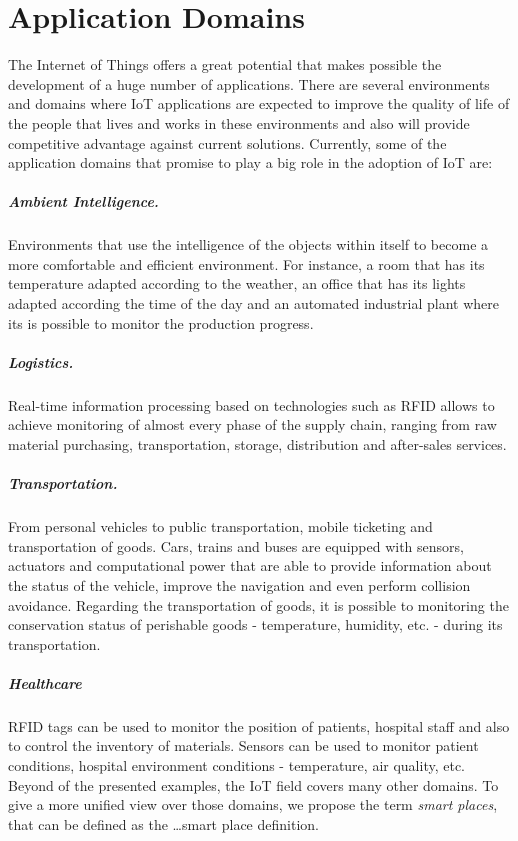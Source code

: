 \section{Application Domains}
\label{sec:application_domains}
The Internet of Things offers a great potential that makes possible the development of a huge number
of applications. There are several environments and domains where \gls{IoT} applications are expected
to improve the quality of life of the people that lives and works in these environments and also
will provide competitive advantage against current solutions. Currently, some of the application
domains that promise to play a big role in the adoption of \gls{IoT} are:

\subparagraph{Ambient Intelligence.} Environments that use the intelligence of the objects within
itself to become a more comfortable and efficient environment. For instance, a room that has its
temperature adapted according to the weather, an office that has its lights adapted according the time
of the day and an automated industrial plant where its is possible to monitor the production progress.
\subparagraph{Logistics.} Real-time information processing based on technologies such as \gls{RFID}
allows to achieve monitoring of almost every phase of the supply chain, ranging from raw material
purchasing, transportation, storage, distribution and after-sales services.
\subparagraph{Transportation.} From personal vehicles to public transportation, mobile ticketing
and transportation of goods. Cars, trains and buses are equipped with sensors, actuators and computational
power that are able to provide information about the status of the vehicle, improve the navigation and
even perform collision avoidance. Regarding the transportation of goods, it is possible to monitoring
the conservation status of perishable goods - temperature, humidity, etc. -  during its transportation.
\subparagraph{Healthcare} \gls{RFID} tags can be used to monitor the position of patients,
hospital staff and also to control the inventory of materials. Sensors can be used to monitor
patient conditions, hospital environment conditions - temperature, air quality, etc.\\

Beyond of the presented examples, the \gls{IoT} field covers many other domains. To give a more unified
view over those domains, we propose the term \textit{smart places}, that can be defined as the
\ldots smart place definition.

